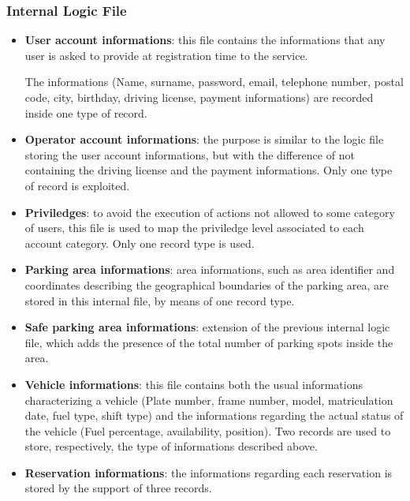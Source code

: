 \subsubsection{Internal Logic File}

\begin{itemize}
	\item \textbf{User account informations}: this file contains the informations that any user is asked to provide at registration time to the service.

The informations (Name, surname, password, email, telephone number, postal code, city, birthday, driving license, payment informations) are recorded inside one type of record.

	\item \textbf{Operator account informations}: the purpose is similar to the logic file storing the user account informations, but with the difference of not containing the driving license and the payment informations. Only one type of record is exploited.

	\item \textbf{Priviledges}: to avoid the execution of actions not allowed to some category of users, this file is used to map the priviledge level associated to each account category. Only one record type is used.

	\item \textbf{Parking area informations}: area informations, such as area identifier and coordinates describing the geographical boundaries of the parking area, are stored in this internal file, by means of one record type.

	\item \textbf{Safe parking area informations}: extension of the previous internal logic file, which adds the presence of the total number of parking spots inside the area.

	\item \textbf{Vehicle informations}: this file contains both the usual informations characterizing a vehicle (Plate number, frame number, model, matriculation date, fuel type, shift type) and the informations regarding the actual status of the vehicle (Fuel percentage, availability, position). Two records are used to store, respectively, the type of informations described above.

	\item \textbf{Reservation informations}: the informations regarding each reservation is stored by the support of three records.


\end{itemize}
